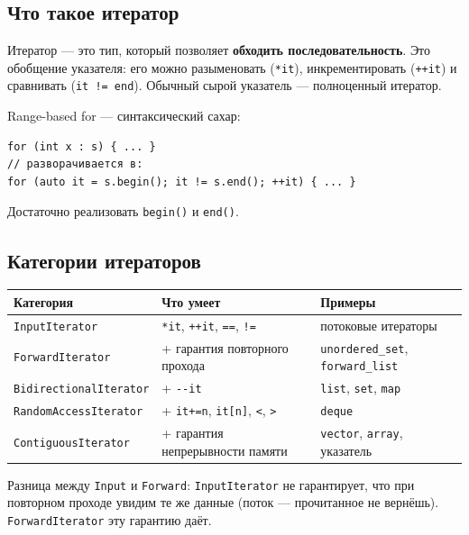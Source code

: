 \documentclass[a4paper,12pt]{article}
\begin{document}
\subsection{Что такое итератор}

Итератор --- это тип, который позволяет \textbf{обходить последовательность}.
Это обобщение указателя: его можно разыменовать (\texttt{*it}),
инкрементировать (\texttt{++it}) и сравнивать (\texttt{it != end}).
Обычный сырой указатель --- полноценный итератор.

Range-based for --- синтаксический сахар:
\begin{lstlisting}
for (int x : s) { ... }
// разворачивается в:
for (auto it = s.begin(); it != s.end(); ++it) { ... }
\end{lstlisting}
Достаточно реализовать \texttt{begin()} и \texttt{end()}.

\subsection{Категории итераторов}

\begin{center}
\begin{tabular}{lp{5.2cm}p{4cm}}
\toprule
\textbf{Категория} & \textbf{Что умеет} & \textbf{Примеры} \\
\midrule
\texttt{InputIterator}
    & \texttt{*it}, \texttt{++it}, \texttt{==}, \texttt{!=}
    & потоковые итераторы \\
\addlinespace
\texttt{ForwardIterator}
    & + гарантия повторного прохода
    & \texttt{unordered\_set}, \texttt{forward\_list} \\
\addlinespace
\texttt{BidirectionalIterator}
    & + \texttt{-{}-it}
    & \texttt{list}, \texttt{set}, \texttt{map} \\
\addlinespace
\texttt{RandomAccessIterator}
    & + \texttt{it+=n}, \texttt{it[n]}, \texttt{<}, \texttt{>}
    & \texttt{deque} \\
\addlinespace
\texttt{ContiguousIterator}
    & + гарантия непрерывности памяти
    & \texttt{vector}, \texttt{array}, указатель \\
\bottomrule
\end{tabular}
\end{center}

\medskip
Разница между \texttt{Input} и \texttt{Forward}: \texttt{InputIterator}
не гарантирует, что при повторном проходе увидим те же данные (поток ---
прочитанное не вернёшь). \texttt{ForwardIterator} эту гарантию даёт.
\end{document}

